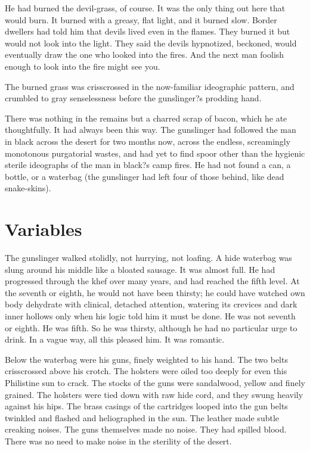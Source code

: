 \documentclass[
11pt,%
tightenlines,%
twoside,%
onecolumn,%
nofloats,%
nobibnotes,%
nofootinbib,%
superscriptaddress,%
noshowpacs,%
centertags]%
{revtex4}
\begin{document}
He had burned the devil-grass, of course. It was the only thing out here that would burn. It burned with a greasy, flat light, and it burned slow. Border dwellers had told him that devils lived even in the flames. They burned it but would not look into the light. They said the devils hypnotized, beckoned, would eventually draw the one who looked into the fires. And the next man foolish enough to look into the fire might see you.

The burned grass was crisscrossed in the now-familiar ideographic pattern, and crumbled to gray senselessness before the gunslinger?s prodding hand. 

There was nothing in the remains but a charred scrap of bacon, which he ate thoughtfully. It had always been this way. The gunslinger had followed the man in black across the desert for two months now, across the endless, screamingly monotonous purgatorial wastes, and had yet to find spoor other than the hygienic sterile ideographs of the man in black?s camp fires. He had not found a can, a bottle, or a waterbag (the gunslinger had left four of those behind, like dead snake-skins).

\section{Variables}

The gunslinger walked stolidly, not hurrying, not loafing. A hide waterbag was slung around his middle like a bloated sausage. It was almost full. He had progressed through the khef over many years, and had reached the fifth level. At the seventh or eighth, he would not have been thirsty; he could have watched own body dehydrate with clinical, detached attention, watering its crevices and dark inner hollows only when his logic told him it must be done. He was not seventh or eighth. He was fifth. So he was thirsty, although he had no particular urge to drink. In a vague way, all this pleased him. It was romantic.

Below the waterbag were his guns, finely weighted to his hand. The two belts crisscrossed above his crotch. The holsters were oiled too deeply for even this Philistine sun to crack. The stocks of the guns were sandalwood, yellow and finely grained. The holsters were tied down with raw hide cord, and they swung heavily against his hips. The brass casings of the cartridges looped into the gun belts twinkled and flashed and heliographed in the sun. The leather made subtle creaking noises. The guns themselves made no noise. They had spilled blood. There was no need to make noise in the sterility of the desert.
\end{document}
